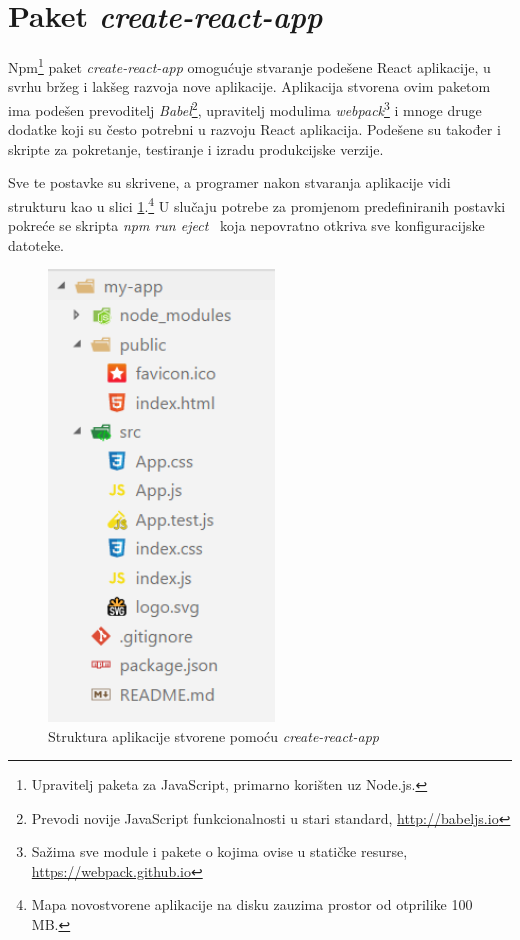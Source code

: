 \documentclass[times, utf8, zavrsni, numeric]{fer}
\newcommand{\razmaks}{\vspace{10pt}}
\begin{document}
\newpage


\section{Paket \emph{create-react-app}}

Npm\footnote{Upravitelj paketa za JavaScript, primarno korišten uz Node.js.} paket \emph{create-react-app} omogućuje stvaranje podešene React aplikacije, u svrhu bržeg i lakšeg razvoja nove aplikacije.
Aplikacija stvorena ovim paketom ima podešen prevoditelj \emph{Babel}\footnote{Prevodi novije JavaScript funkcionalnosti u stari standard, \url{http://babeljs.io} }, upravitelj modulima \emph{webpack}\footnote{Sažima sve module i pakete o kojima ovise u statičke resurse, \url{https://webpack.github.io} } i mnoge druge dodatke koji su često potrebni u razvoju React aplikacija.\citep{createReactAppGithub}
Podešene su također i skripte za pokretanje, testiranje i izradu produkcijske verzije.

Sve te postavke su skrivene, a programer nakon stvaranja aplikacije vidi strukturu kao u slici \ref{fig:app-structure}.\footnote{Mapa novostvorene aplikacije na disku zauzima prostor od otprilike 100 MB.}
U slučaju potrebe za promjenom predefiniranih postavki pokreće se skripta \glqq \emph{npm run eject}\grqq ~ koja nepovratno otkriva sve konfiguracijske datoteke.

\razmaks

\begin{figure}[htb]
\centering
\includegraphics[width=6cm]{img/app-structure.png}
\caption{Struktura aplikacije stvorene pomoću \emph{create-react-app}}
\label{fig:app-structure}
\end{figure}
\end{document}
